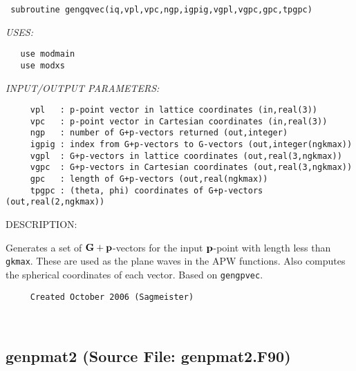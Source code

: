 \documentclass[11pt]{article}
\begin{document}
\begin{verbatim} subroutine gengqvec(iq,vpl,vpc,ngp,igpig,vgpl,vgpc,gpc,tpgpc)\end{verbatim}{\em USES:}
\begin{verbatim}   use modmain
   use modxs\end{verbatim}{\em INPUT/OUTPUT PARAMETERS:}
\begin{verbatim}     vpl   : p-point vector in lattice coordinates (in,real(3))
     vpc   : p-point vector in Cartesian coordinates (in,real(3))
     ngp   : number of G+p-vectors returned (out,integer)
     igpig : index from G+p-vectors to G-vectors (out,integer(ngkmax))
     vgpl  : G+p-vectors in lattice coordinates (out,real(3,ngkmax))
     vgpc  : G+p-vectors in Cartesian coordinates (out,real(3,ngkmax))
     gpc   : length of G+p-vectors (out,real(ngkmax))
     tpgpc : (theta, phi) coordinates of G+p-vectors (out,real(2,ngkmax))\end{verbatim}
{\sf DESCRIPTION:\\ }


     Generates a set of ${\bf G+p}$-vectors for the input ${\bf p}$-point with
     length less than {\tt gkmax}. These are used as the plane waves in the APW
     functions. Also computes the spherical coordinates of each vector.
     Based on {\tt gengpvec}.
  
\begin{verbatim}     Created October 2006 (Sagmeister)\end{verbatim}












 
 
\mbox{}\hrulefill\ 
 
\subsection{genpmat2 (Source File: genpmat2.F90)}
\end{document}
